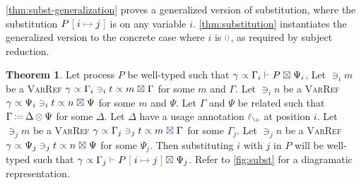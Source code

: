 \documentclass[a4paper,UKenglish,cleveref,autoref,thm-restate,authorcolumns]{lipics-v2019}
\theoremstyle{definition}
\newtheorem{nitheorem}[theorem]{Theorem}
\newcommand{\type}[1]{\textcolor{BlueViolet}{\operatorname{#1}}}
\newcommand{\constr}[1]{\textcolor{BurntOrange}{\operatorname{#1}}}
\newcommand{\func}[1]{\textcolor{OliveGreen}{\operatorname{#1}}}
\newcommand{\subst}[3]{#1 \; \func{[} \; #3 \; \func{\mapsto} \;#2 \; \func{]}}
\newcommand{\opctx}[3]{#1 \, \func{\coloneqq} \, #2 \, \func{\otimes} \, #3}
\newcommand{\lz}{\func{\ell_{\o}}}
\newcommand{\types}[4]{#1 \; \type{\propto} \; #2 \; \type{\vdash} \; #3 \; \type{\boxtimes} \; #4}
\newcommand{\contains}[6]{#1 \; \type{\propto} \; #2 \; \type{\ni}_{#3} \; #4 \; \type{\propto} \; #5 \; \type{\boxtimes} \; #6}
\begin{document}
\autoref{thm:subst-generalization} proves a generalized version of substitution, where the substitution $\subst{P}{j}{i}$ is on any variable $i$.
\autoref{thm:substitution} instantiates the generalized version to the concrete case where $i$ is $\constr{0}$, as required by subject reduction.
\begin{nitheorem}
  \label{thm:subst-generalization}
  Let process $P$ be well-typed such that $\types{\gamma}{\Gamma_i}{P}{\Psi_i}$,
  Let $\ni_i m$ be a \textsc{VarRef} $\contains{\gamma}{\Gamma_i}{i}{t}{m}{\Gamma}$ for some $m$ and $\Gamma$.
  Let $\ni_i n$ be a \textsc{VarRef} $\contains{\gamma}{\Psi_i}{i}{t}{n}{\Psi}$ for some $m$ and $\Psi$.
  Let $\Gamma$ and $\Psi$ be related such that $\opctx{\Gamma}{\Delta}{\Psi}$ for some $\Delta$.
  Let $\Delta$ have a usage annotation $\lz$ at position $i$.
  Let $\ni_j m$ be a \textsc{VarRef} $\contains{\gamma}{\Gamma_j}{j}{t}{m}{\Gamma}$ for some $\Gamma_j$.
  Let $\ni_j n$ be a \textsc{VarRef} $\contains{\gamma}{\Psi_j}{j}{t}{n}{\Psi}$ for some $\Psi_j$.
  Then substituting $i$ with $j$ in $P$ will be well-typed such that $\types{\gamma}{\Gamma_j}{\subst{P}{j}{i}}{\Psi_j}$.
  Refer to \autoref{fig:subst} for a diagramatic representation.
\end{nitheorem}
\end{document}
